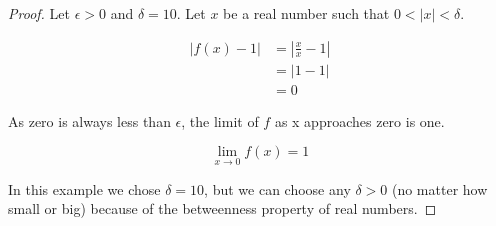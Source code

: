 \documentclass{article}
\begin{document}
\begin{proof}
Let $\epsilon > 0$ and $\delta = 10$. Let $x$ be a real number such that $0 < |x| < \delta$.

\begin{align*}
|f(x) - 1| &= |\frac{x}{x} - 1| \\
&= |1 - 1| \\
&= 0
\end{align*}

As zero is always less than $\epsilon$, the limit of $f$ as x approaches zero is one.

\begin{equation*}
\lim_{x \to 0} f(x) = 1
\end{equation*}

In this example we chose $\delta = 10$, but we can choose any $\delta > 0$ (no matter how small or big) because of the betweenness property of real numbers.

\end{proof}
\end{document}
